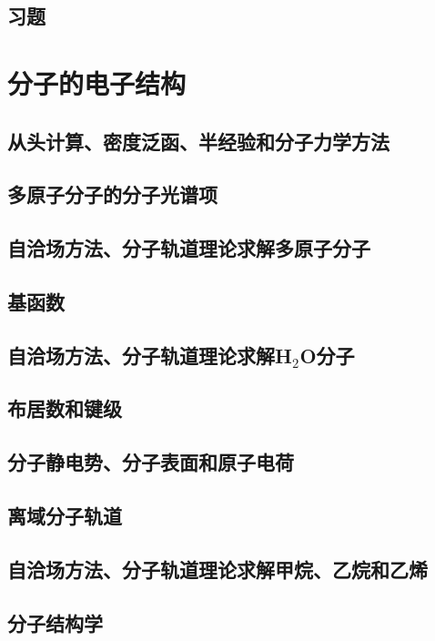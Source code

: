 \documentclass{book}
\begin{document}
	\section*{习题}
	
	\chapter{分子的电子结构}
	\section{从头计算、密度泛函、半经验和分子力学方法}
	
	\section{多原子分子的分子光谱项}
	
	\section{自洽场方法、分子轨道理论求解多原子分子}
	
	\section{基函数}
	
	\section{自洽场方法、分子轨道理论求解H$_2$O分子}
	
	\section{布居数和键级}
	
	\section{分子静电势、分子表面和原子电荷}
	
	\section{离域分子轨道}
	
	\section{自洽场方法、分子轨道理论求解甲烷、乙烷和乙烯}
	
	\section{分子结构学}
	
\end{document}
